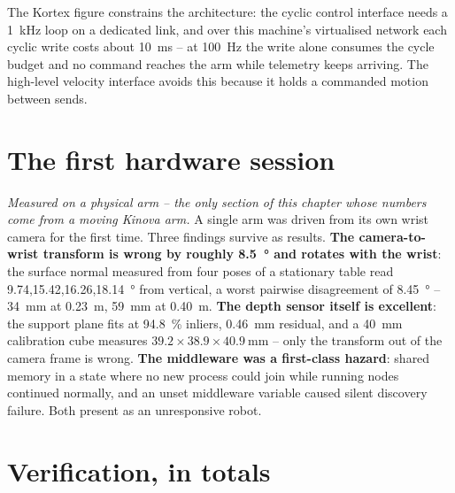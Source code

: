The Kortex figure constrains the architecture: the cyclic control interface
needs a \SI{1}{\kilo\hertz} loop on a dedicated link, and over this
machine's virtualised network each cyclic write costs about
\SI{10}{\milli\second} -- at \SI{100}{\hertz} the write alone consumes the
cycle budget and no command reaches the arm while telemetry keeps arriving.
The high-level velocity interface avoids this because it holds a commanded
motion between sends.

\section{The first hardware session}
\label{sec:hardware-session}
\label{sec:hardware}

\emph{Measured on a physical arm -- the only section of this chapter whose
numbers come from a moving Kinova arm.} A single arm was driven from its own
wrist camera for the first time. Three findings survive as results.
\textbf{The camera-to-wrist transform is wrong by roughly \SI{8.5}{\degree}
and rotates with the wrist}: the surface normal measured from four poses of
a stationary table read \SI{9.74}{},\SI{15.42}{},\SI{16.26}{},\SI{18.14}{\degree}
from vertical, a worst pairwise disagreement of \SI{8.45}{\degree} --
\SI{34}{\milli\metre} at \SI{0.23}{\metre}, \SI{59}{\milli\metre} at
\SI{0.40}{\metre}. \textbf{The depth sensor itself is excellent}: the
support plane fits at \SI{94.8}{\percent} inliers, \SI{0.46}{\milli\metre}
residual, and a \SI{40}{\milli\metre} calibration cube measures $39.2 \times
38.9 \times \SI{40.9}{\milli\metre}$ -- only the transform out of the camera
frame is wrong. \textbf{The middleware was a first-class hazard}: shared
memory in a state where no new process could join while running nodes
continued normally, and an unset middleware variable caused silent discovery
failure. Both present as an unresponsive robot.

\section{Verification, in totals}

